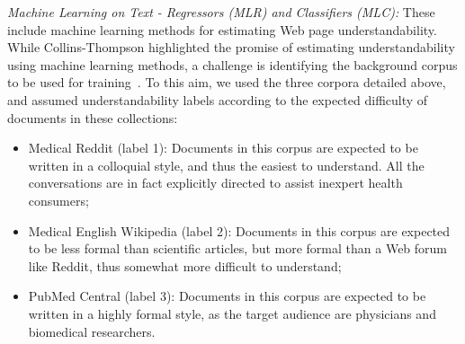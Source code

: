 \documentclass[10pt,a4paper]{article}
\begin{document}
\begin{table}[!tb]
	\centering    
	\caption{Statistics for the corpora used as background models for understandability estimations.}
	\label{tab:collection_stats}
\end{table}


\textit{Machine Learning on Text - Regressors (MLR) and Classifiers (MLC):} These include machine learning methods for estimating Web page understandability. While Collins-Thompson highlighted the promise of estimating understandability using machine learning methods, a challenge is identifying the background corpus to be used for training~\cite{collins2014computational}. To this aim, we used the three corpora detailed above, and assumed understandability labels according to the expected difficulty of documents in these collections:

\begin{itemize}[leftmargin=*]
    \item Medical Reddit (label 1): Documents in this corpus are expected to be written in a colloquial style, and thus the easiest to understand. All the conversations are in fact explicitly directed to assist inexpert health consumers;
	\item Medical English Wikipedia (label 2): Documents in this corpus are expected to be less formal than scientific articles, but more formal than a Web forum like Reddit, thus somewhat more difficult to understand;
	\item PubMed Central (label 3): Documents in this corpus are expected to be written in a highly formal style, as the target audience are physicians and biomedical researchers.
\end{itemize}
\end{document}
